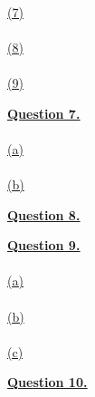 \documentclass[12pt]{article}
\begin{document}
~\\\hyperlink{toc}{\hypertarget{6.7}{(7)}}\\

~\\\hyperlink{toc}{\hypertarget{6.8}{(8)}}\\

~\\\hyperlink{toc}{\hypertarget{6.9}{(9)}}\\
\newpage

\hyperlink{toc}{\LARGE \underline{\textbf{Question 7.}}}\\
~\\\hyperlink{toc}{\hypertarget{7.1}{(a)}}\\

~\\\hyperlink{toc}{\hypertarget{7.2}{(b)}}\\
\newpage

\hyperlink{toc}{\hypertarget{8}{\LARGE \underline{\textbf{Question 8.}}}}\\
\newpage

\hyperlink{toc}{\LARGE \underline{\textbf{Question 9.}}}\\
~\\\hyperlink{toc}{\hypertarget{9.1}{(a)}}\\

~\\\hyperlink{toc}{\hypertarget{9.2}{(b)}}\\

~\\\hyperlink{toc}{\hypertarget{9.3}{(c)}}\\
\newpage

\hyperlink{toc}{\hypertarget{10}{\LARGE \underline{\textbf{Question 10.}}}}\\
\newpage
\end{document}
